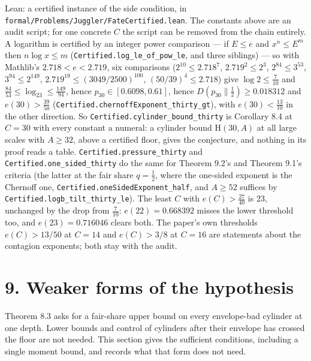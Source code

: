 \documentclass[11pt,a4paper]{article}
\begin{document}
Lean: a certified instance of the side condition, in
\texttt{\nolinkurl{formal/Problems/Juggler/FateCertified.lean}}. The
constants above are an audit script; for one concrete \(C\) the script
can be removed from the chain entirely. A logarithm is certified by an
integer power comparison --- if \(E\le e\) and \(x^n\le E^m\) then
\(n\log x\le m\) (\texttt{\nolinkurl{Certified.log_le_of_pow_le}}, and
three siblings) --- so with Mathlib's \(2.718<e<2.719\), six comparisons
(\(2^{10}\le2.718^{7}\), \(2.719^{2}\le2^{3}\), \(2^{84}\le3^{53}\),
\(3^{94}\le2^{149}\), \(2.719^{19}\le(3049/2500)^{100}\),
\((50/39)^{4}\le2.718\)) give \(\log 2\le\tfrac7{10}\) and
\(\tfrac{84}{53}\le\log_23\le\tfrac{149}{94}\), hence
\(p_{30}\in[0.6098,0.61]\), hence \(D(p_{30}\|\tfrac12)\ge0.018312\) and
\(e(30)>\tfrac{39}{50}\)
(\texttt{\nolinkurl{Certified.chernoffExponent_thirty_gt}}), with
\(e(30)<\tfrac{13}{10}\) in the other direction. So
\texttt{\nolinkurl{Certified.cylinder_bound_thirty}} is Corollary 8.4 at
\(C=30\) with every constant a numeral: a cylinder bound
\(\mathrm H(30,A)\) at all large scales with \(A\ge32\), above a
certified floor, gives the conjecture, and nothing in its proof reads a
table. \texttt{\nolinkurl{Certified.pressure_thirty}} and
\texttt{\nolinkurl{Certified.one_sided_thirty}} do the same for Theorem
9.2's and Theorem 9.1's criteria (the latter at the fair share
\(q=\tfrac12\), where the one-sided exponent is the Chernoff one,
\texttt{\nolinkurl{Certified.oneSidedExponent_half}}, and \(A\ge52\)
suffices by \texttt{\nolinkurl{Certified.logb_tilt_thirty_le}}). The
least \(C\) with \(e(C)>\tfrac{27}{40}\) is \(23\), unchanged by the
drop from \(\tfrac7{10}\): \(e(22)=0.668392\) misses the lower threshold
too, and \(e(23)=0.716046\) clears both. The paper's own thresholds
\(e(C)>13/50\) at \(C=14\) and \(e(C)>3/8\) at \(C=16\) are statements
about the contagion exponents; both stay with the audit.

\section{9. Weaker forms of the
hypothesis}\label{weaker-forms-of-the-hypothesis}

Theorem 8.3 asks for a fair-share upper bound on every envelope-bad
cylinder at one depth. Lower bounds and control of cylinders after their
envelope has crossed the floor are not needed. This section gives the
sufficient conditions, including a single moment bound, and records what
that form does not need.
\end{document}
